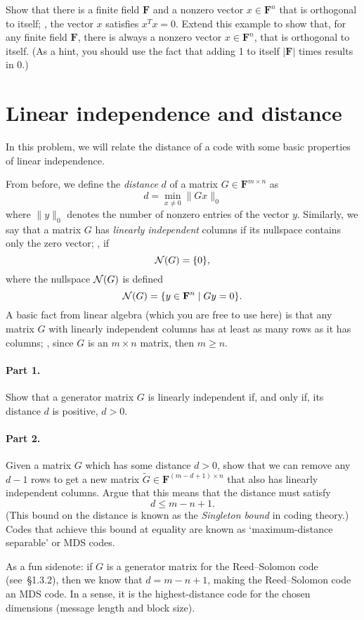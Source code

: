 \documentclass[12pt]{article}
\newcommand{\field}{\mathbf{F}}
\begin{document}
Show that there is a finite field $\field$ and a nonzero vector $x \in
\field^n$ that is orthogonal to itself; \ie, the vector $x$ satisfies $x^Tx =
0$. Extend this example to show that, for any finite field $\field$, there is
always a nonzero vector $x \in \field^n$, that is orthogonal to itself. (As a
hint, you should use the fact that adding 1 to itself $|\field|$ times results
in 0.)

\section{Linear independence and distance}
In this problem, we will relate the distance of a code with some basic
properties of linear independence.

From before, we define the \emph{distance} $d$ of a matrix $G \in \field^{m\times n}$
as
\[
    d = \min_{x \ne 0} \|Gx\|_0
\]
where $\|y\|_0$ denotes the number of nonzero entries of the vector $y$.
Similarly, we say that a matrix $G$ has \emph{linearly independent} columns if
its nullspace contains only the zero vector; \ie, if
\[
    {\mathcal N}(G) = \{0\},
\]
where the nullspace ${\mathcal N}(G)$ is defined
\[
    \nullspace(G) = \{y \in \field^n \mid Gy = 0\}.
\]
A basic fact from linear algebra (which you are free to use here) is that any
matrix $G$ with linearly independent columns has at least as many rows as it
has columns; \ie, since $G$ is an $m\times n$ matrix, then $m \ge n$.

\paragraph{Part 1.} Show that a generator matrix $G$ is linearly independent
if, and only if, its distance $d$ is positive, $d > 0$.

\paragraph{Part 2.} Given a matrix $G$ which has some distance $d > 0$, show
that we can remove any $d-1$ rows to get a new matrix $\tilde G \in
\field^{(m-d + 1)\times n}$ that also has linearly independent columns. Argue that
this means that the distance must satisfy
\[
    d \le m - n + 1.
\]
(This bound on the distance is known as the \emph{Singleton bound} in coding
theory.) Codes that achieve this bound at equality are known as
`maximum-distance separable' or MDS codes.

As a fun sidenote: if $G$ is a generator matrix for the Reed--Solomon code
(see~\S1.3.2), then we know that $d = m - n + 1$, making the Reed--Solomon code
an MDS code. In a sense, it is the highest-distance code for the chosen
dimensions (message length and block size).
\end{document}
